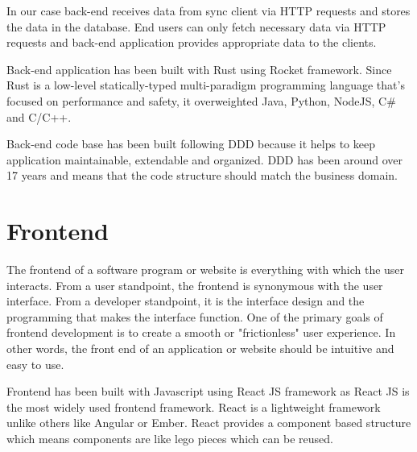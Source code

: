 In our case back-end receives data from sync client via HTTP requests and stores the data in the database.
End users can only fetch necessary data via HTTP requests and back-end application provides appropriate data to the clients.

Back-end application has been built with Rust using Rocket framework.
Since Rust is a low-level statically-typed multi-paradigm programming language that’s focused on performance and safety, it overweighted Java, Python, NodeJS, C\# and C/C++.

Back-end code base has been built following DDD because it helps to keep application maintainable, extendable and organized.
DDD has been around over 17 years and means that the code structure should match the business domain.

\section{Frontend}\label{sec:frontend}
 The frontend of a software program or website is everything with which the user interacts.
 From a user standpoint, the frontend is synonymous with the user interface.
 From a developer standpoint, it is the interface design and the programming that makes the interface function.
 One of the primary goals of frontend development is to create a smooth or "frictionless" user experience.
 In other words, the front end of an application or website should be intuitive and easy to use.

 Frontend has been built with Javascript using React JS framework as React JS is the most widely used frontend framework.
 React is a lightweight framework unlike others like Angular or Ember.
 React provides a component based structure which means components are like lego pieces which can be reused.

